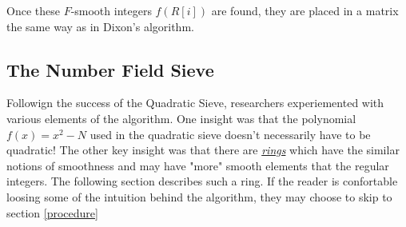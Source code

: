 \documentclass[10pt,a4paper]{article}
\theoremstyle{plain}
\theoremstyle{definition}
\theoremstyle{remark}
\begin{document}
  Once these $F$-smooth integers $f(R[i])$ are found, they are placed in a matrix the same way as in Dixon's algorithm. 
   
\subsection{The Number Field Sieve}
  Followign the success of the Quadratic Sieve, researchers experiemented with various elements of the algorithm. One insight was that the polynomial $f(x) = x^2 - N $ used in the quadratic sieve doesn't necessarily have to be quadratic! The other key insight was that there are \hyperref[ring]{\textit{rings}} which have the similar notions of smoothness and may have "more" smooth elements that the regular integers. The following section describes such a ring. If the reader is confortable loosing some of the intuition behind the algorithm, they may choose to skip to section \ref{procedure}
\end{document}
